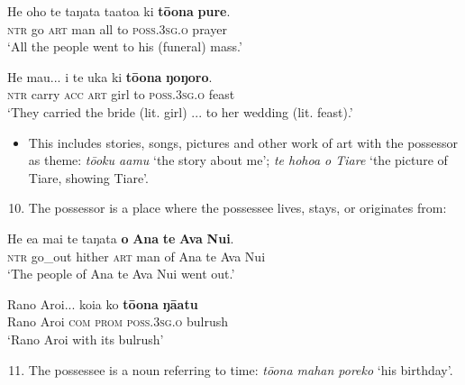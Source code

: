 \ea\label{ex:6.92}
\gll He oho te taŋata ta{\ꞌ}ato{\ꞌ}a ki \textbf{tō{\ꞌ}ona} \textbf{pure}. \\
\textsc{ntr} go \textsc{art} man all to \textsc{poss.3sg.o} prayer \\

\glt 
‘All the people went to his (funeral) mass.’ \textstyleExampleref{[R309.141]} 
\z

\ea\label{ex:6.93}
\gll He ma{\ꞌ}u... i te uka ki \textbf{tō{\ꞌ}ona} \textbf{ŋoŋoro}. \\
\textsc{ntr} carry \textsc{acc} \textsc{art} girl to \textsc{poss.3sg.o} feast \\

\glt
‘They carried the bride (lit. girl) ... to her wedding (lit. feast).’ \textstyleExampleref{[R539-3.033]}
\z
\begin{itemize}
\item[]
This includes stories, songs, pictures and other work of art with the possessor as theme: \textit{tō{\ꞌ}oku {\ꞌ}a{\ꞌ}amu} ‘the story about me’; \textit{te hoho{\ꞌ}a o Tiare} ‘the picture of Tiare, showing Tiare’.
\end{itemize}

\begin{enumerate}
\setcounter{enumi}{9}
\item 
The possessor is a place where the possessee lives, stays, or originates from:

\end{enumerate}

\ea\label{ex:6.94}
\gll He e{\ꞌ}a mai te taŋata \textbf{o} \textbf{{\ꞌ}Ana} \textbf{te} \textbf{Ava} \textbf{Nui}. \\
\textsc{ntr} go\_out hither \textsc{art} man of Ana te Ava Nui \\

\glt 
‘The people of Ana te Ava Nui went out.’ \textstyleExampleref{[Mtx-3-01.283]}
\z

\ea\label{ex:6.95}
\gll Rano Aroi... koia ko \textbf{tō{\ꞌ}ona} \textbf{ŋā{\ꞌ}atu} \\
Rano Aroi \textsc{com} \textsc{prom} \textsc{poss.3sg.o} bulrush \\

\glt
‘Rano Aroi with its bulrush’ \textstyleExampleref{[R112.051]} 
\z

\begin{enumerate}
\setcounter{enumi}{10}
\item 
The possessee is a noun referring to time: \textit{t}\textit{ō{\ꞌ}ona mahan poreko} ‘his birthday’.

\end{enumerate}

